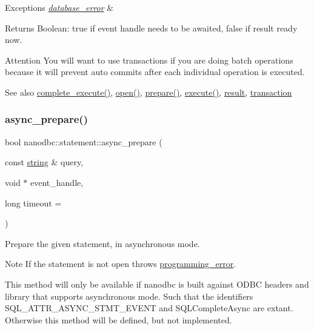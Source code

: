 \begin{DoxyExceptions}{Exceptions}
{\em \mbox{\hyperlink{classnanodbc_1_1database__error}{database\+\_\+error}}} & \\
\hline
\end{DoxyExceptions}
\begin{DoxyReturn}{Returns}
Boolean\+: true if event handle needs to be awaited, false if result ready now. 
\end{DoxyReturn}
\begin{DoxyAttention}{Attention}
You will want to use transactions if you are doing batch operations because it will prevent auto commits after each individual operation is executed. 
\end{DoxyAttention}
\begin{DoxySeeAlso}{See also}
\mbox{\hyperlink{classnanodbc_1_1statement_aa4a0bb3fc0112469e837e1acd5ef3f6a}{complete\+\_\+execute()}}, \mbox{\hyperlink{classnanodbc_1_1statement_a473ec2d726f6d8acc42ce0f5f6d1b967}{open()}}, \mbox{\hyperlink{classnanodbc_1_1statement_a63b56d30a303014ce8f80df5e5b67dca}{prepare()}}, \mbox{\hyperlink{classnanodbc_1_1statement_ab30dac3e4defd5a90181202e99ee8ca5}{execute()}}, \mbox{\hyperlink{classnanodbc_1_1result}{result}}, \mbox{\hyperlink{classnanodbc_1_1transaction}{transaction}} 
\end{DoxySeeAlso}
\mbox{\label{classnanodbc_1_1statement_ab676933b9578da7d773f97269d270eee}} 
\subsubsection{\texorpdfstring{async\_prepare()}{async\_prepare()}}
{\footnotesize\ttfamily bool nanodbc\+::statement\+::async\+\_\+prepare (\begin{DoxyParamCaption}\item[{const \mbox{\hyperlink{namespacenanodbc_abfc0ece56278e590911ec8352774c212}{string}} \&}]{query,  }\item[{void $\ast$}]{event\+\_\+handle,  }\item[{long}]{timeout = {} }\end{DoxyParamCaption})}



Prepare the given statement, in asynchronous mode. 

\begin{DoxyNote}{Note}
If the statement is not open throws \mbox{\hyperlink{classnanodbc_1_1programming__error}{programming\+\_\+error}}.
\end{DoxyNote}
This method will only be available if nanodbc is built against O\+D\+BC headers and library that supports asynchronous mode. Such that the identifiers {\ttfamily S\+Q\+L\+\_\+\+A\+T\+T\+R\+\_\+\+A\+S\+Y\+N\+C\+\_\+\+S\+T\+M\+T\+\_\+\+E\+V\+E\+NT} and {\ttfamily S\+Q\+L\+Complete\+Async} are extant. Otherwise this method will be defined, but not implemented.


